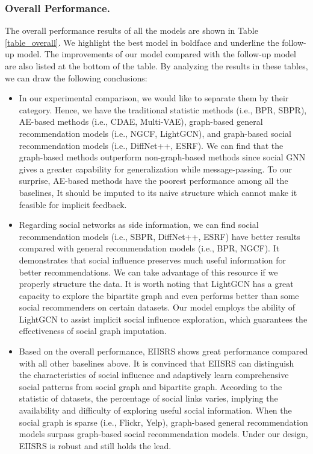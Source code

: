 \documentclass[letterpaper]{article} %
\begin{document}
\subsubsection{Overall Performance.}
The overall performance results of all the models are shown in Table \ref{table_overall}. We highlight the best model in boldface and underline the follow-up model. The improvements of our model compared with the follow-up model are also listed at the bottom of the table. By analyzing the results in these tables, we can draw the following conclusions:
\begin{itemize}
    \item In our experimental comparison, we would like to separate them by their category. Hence, we have the traditional statistic methods (i.e., BPR, SBPR), AE-based methods (i.e., CDAE, Multi-VAE), graph-based general recommendation models (i.e., NGCF, LightGCN), and graph-based social recommendation models (i.e., DiffNet++, ESRF). We can find that the graph-based methods outperform non-graph-based methods since social GNN gives a greater capability for generalization while message-passing. To our surprise, AE-based methods have the poorest performance among all the baselines, It should be imputed to its naive structure which cannot make it feasible for implicit feedback.
    \item Regarding social networks as side information, we can find social recommendation models (i.e., SBPR, DiffNet++, ESRF) have better results compared with general recommendation models (i.e., BPR, NGCF). It demonstrates that social influence preserves much useful information for better recommendations. We can take advantage of this resource if we properly structure the data. It is worth noting that LightGCN has a great capacity to explore the bipartite graph and even performs better than some social recommenders on certain datasets. Our model employs the ability of LightGCN to assist implicit social influence exploration, which guarantees the effectiveness of social graph imputation.
    \item Based on the overall performance, EIISRS shows great performance compared with all other baselines above. It is convinced that EIISRS can distinguish the characteristics of social influence and adaptively learn comprehensive social patterns from social graph and bipartite graph. According to the statistic of datasets, the percentage of social links varies, implying the availability and difficulty of exploring useful social information. When the social graph is sparse (i.e., Flickr, Yelp), graph-based general recommendation models surpass graph-based social recommendation models. Under our design, EIISRS is robust and still holds the lead.
\end{itemize} 
\end{document}
